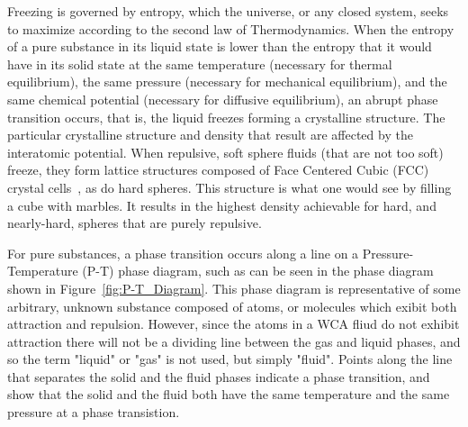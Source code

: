 \documentclass[double,12pt]{beavtex}
\begin{document}
Freezing is governed by entropy, which the universe, or any closed system, 
seeks to maximize according to the second law of Thermodynamics. When the 
entropy of a pure substance in its liquid state is lower than the entropy 
that it would have in its solid state at the same temperature (necessary 
for thermal equilibrium), the same pressure (necessary for mechanical 
equilibrium), and the same chemical potential (necessary for diffusive 
equilibrium), an abrupt phase transition occurs, that is, the liquid freezes 
forming a crystalline structure. The particular crystalline structure and 
density that result are affected by the interatomic potential. When repulsive, 
soft sphere fluids (that are not too soft) freeze, they form lattice 
structures composed of Face Centered Cubic (FCC) crystal cells~\cite{Hansen}, 
as do hard spheres. 
This structure is what one would see by filling a cube with marbles. It 
results in the highest density achievable for hard, and nearly-hard, spheres 
that are purely repulsive. 

For pure substances, a phase transition occurs along a line on a 
Pressure-Temperature (P-T) phase diagram, such as can be seen in the phase 
diagram shown in Figure~\ref{fig:P-T_Diagram}. This phase diagram is 
representative of some arbitrary, unknown substance composed of atoms, 
or molecules which exibit both attraction and repulsion. However, since 
the atoms in a WCA fliud do not exhibit attraction there will not be a 
dividing line between the gas and liquid phases, and so the term "liquid" 
or "gas" is not used, but simply "fluid". Points along the line that 
separates the solid and the fluid phases indicate a phase transition, 
and show that the solid and the fluid both have the same temperature and 
the same pressure at a phase transistion.
\end{document}
